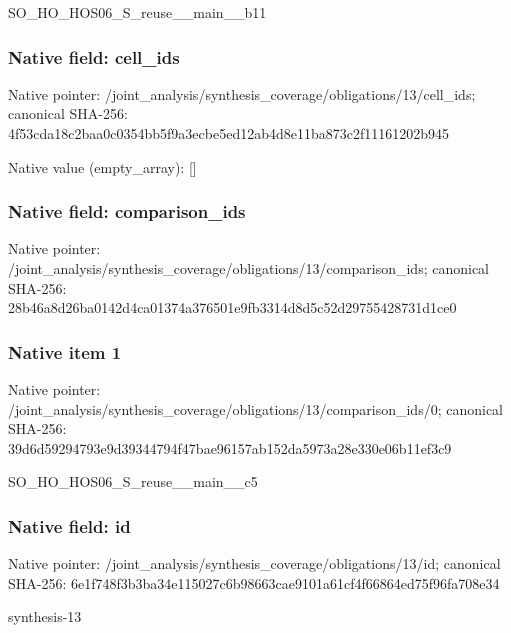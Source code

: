 \documentclass[10pt,a4paper]{article}
\begin{document}
\begingroup\raggedright\sloppy SO\_\allowbreak{}HO\_\allowbreak{}HOS06\_\allowbreak{}S\_\allowbreak{}reuse\_\allowbreak{}\_\allowbreak{}main\_\allowbreak{}\_\allowbreak{}b11\par\endgroup

\subsubsection{Native field: cell\_\allowbreak{}ids}
Native pointer: /joint\_\allowbreak{}analysis/synthesis\_\allowbreak{}coverage/obligations/13/cell\_\allowbreak{}ids; canonical SHA-256: 4f53cda18c2baa0c0354bb5f9a3ecbe5ed12ab4d8e11ba873c2f11161202b945

Native value (empty\_\allowbreak{}array): []

\subsubsection{Native field: comparison\_\allowbreak{}ids}
Native pointer: /joint\_\allowbreak{}analysis/synthesis\_\allowbreak{}coverage/obligations/13/comparison\_\allowbreak{}ids; canonical SHA-256: 28b46a8d26ba0142d4ca01374a376501e9fb3314d8d5c52d29755428731d1ce0

\subsubsection{Native item 1}
Native pointer: /joint\_\allowbreak{}analysis/synthesis\_\allowbreak{}coverage/obligations/13/comparison\_\allowbreak{}ids/0; canonical SHA-256: 39d6d59294793e9d39344794f47bae96157ab152da5973a28e330e06b11ef3c9

\begingroup\raggedright\sloppy SO\_\allowbreak{}HO\_\allowbreak{}HOS06\_\allowbreak{}S\_\allowbreak{}reuse\_\allowbreak{}\_\allowbreak{}main\_\allowbreak{}\_\allowbreak{}c5\par\endgroup

\subsubsection{Native field: id}
Native pointer: /joint\_\allowbreak{}analysis/synthesis\_\allowbreak{}coverage/obligations/13/id; canonical SHA-256: 6e1f748f3b3ba34e115027c6b98663cae9101a61cf4f66864ed75f96fa708e34

\begingroup\raggedright\sloppy synthesis-13\par\endgroup
\end{document}
